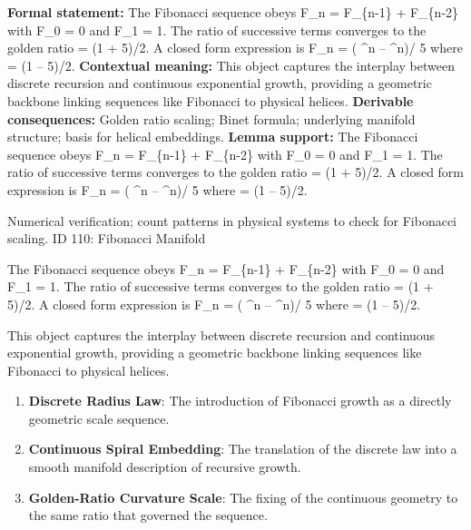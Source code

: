 \begingroup\footnotesize\setlength{\emergencystretch}{3em}\sloppy
\textbf{Formal statement:} The Fibonacci sequence obeys F\_n = F\_\{n-1\} + F\_\{n-2\} with F\_0 = 0 and F\_1 = 1. The ratio of successive terms converges to the golden ratio   = (1 +  5)/2. A closed form expression is F\_n = ( \textasciicircum{}n --  \textasciicircum{}n)/ 5 where   = (1 --  5)/2.
\textbf{Contextual meaning:} This object captures the interplay between discrete recursion and continuous exponential growth, providing a geometric backbone linking sequences like Fibonacci to physical helices.
\textbf{Derivable consequences:} Golden ratio scaling; Binet formula; underlying manifold structure; basis for helical embeddings.
\textbf{Lemma support:} The Fibonacci sequence obeys F\_n = F\_\{n-1\} + F\_\{n-2\} with F\_0 = 0 and F\_1 = 1. The ratio of successive terms converges to the golden ratio   = (1 +  5)/2. A closed form expression is F\_n = ( \textasciicircum{}n --  \textasciicircum{}n)/ 5 where   = (1 --  5)/2.\par
\endgroup

Numerical verification; count patterns in physical systems to check for Fibonacci scaling. ID 110: Fibonacci Manifold

The Fibonacci sequence obeys F\_n = F\_\{n-1\} + F\_\{n-2\} with F\_0 = 0 and F\_1 = 1. The ratio of successive terms converges to the golden ratio   = (1 +  5)/2. A closed form expression is F\_n = ( \textasciicircum{}n --  \textasciicircum{}n)/ 5 where   = (1 --  5)/2.

This object captures the interplay between discrete recursion and continuous exponential growth, providing a geometric backbone linking sequences like Fibonacci to physical helices.
\endgroup

\begin{enumerate}[leftmargin=1.6em,itemsep=6pt,topsep=4pt]
\item \textbf{Discrete Radius Law}: The introduction of Fibonacci growth as a directly geometric scale sequence.
\item \textbf{Continuous Spiral Embedding}: The translation of the discrete law into a smooth manifold description of recursive growth.
\item \textbf{Golden-Ratio Curvature Scale}: The fixing of the continuous geometry to the same ratio that governed the sequence.
\end{enumerate}

